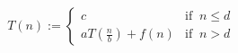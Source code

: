\begin{align*}
T(n) :=
\begin{cases}
c & \text{if } \ n \leq d \\
aT\left(\frac{n}{b}\right) + f(n) & \text{if } \ n > d
\end{cases}
\end{align*}
